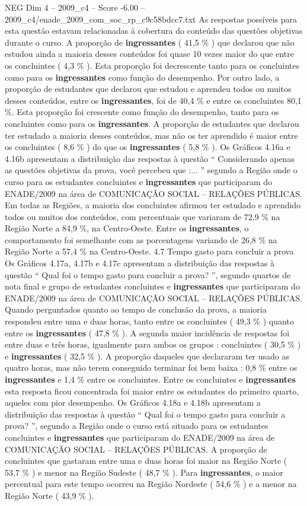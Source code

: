 \begin{textsample}{NEG Dim 4 – 2009\_c4 – Score -6.00 – 2009\_c4/enade\_2009\_com\_soc\_rp\_c9c58bdcc7.txt}
As respostas possíveis para esta questão estavam relacionadas à cobertura do conteúdo das questões objetivas durante o curso.
A proporção de \textbf{ingressantes} ( 41,5 \% ) que declarou que não estudou ainda a maioria desses conteúdos foi quase 10 vezes maior do que entre os concluintes ( 4,3 \% ).
Esta proporção foi decrescente tanto para os concluintes como para os \textbf{ingressantes} como função do desempenho.
Por outro lado, a proporção de estudantes que declarou que estudou e aprendeu todos ou muitos desses conteúdos, entre os \textbf{ingressantes}, foi de 40,4 \% e entre os concluintes 80,1 \%.
Esta proporção foi crescente como função do desempenho, tanto para os concluintes como para os \textbf{ingressantes}.
A proporção de estudantes que declarou ter estudado a maioria desses conteúdos, mas não os ter aprendido é maior entre os concluintes ( 8,6 \% ) do que os \textbf{ingressantes} ( 5,8 \% ).
Os Gráficos 4.16a e 4.16b apresentam a distribuição das respostas à questão “ Considerando apenas as questões objetivas da prova, você percebeu que :... ” segundo a Região onde o curso para os estudantes concluintes e \textbf{ingressantes} que participaram do ENADE/2009 na área de COMUNICAÇÃO SOCIAL – RELAÇÕES PÚBLICAS.
Em todas as Regiões, a maioria dos concluintes afirmou ter estudado e aprendido todos ou muitos dos conteúdos, com percentuais que variaram de 72,9 \% na Região Norte a 84,9 \%, na Centro-Oeste.
Entre os \textbf{ingressantes}, o comportamento foi semelhante com as porcentagens variando de 26,8 \% na Região Norte a 57,4 \% na Centro-Oeste. 4.7 Tempo gasto para concluir a prova Os Gráficos 4.17a, 4.17b e 4.17c apresentam a distribuição das respostas à questão “ Qual foi o tempo gasto para concluir a prova? ”, segundo quartos de nota final e grupo de estudantes concluintes e \textbf{ingressantes} que participaram do ENADE/2009 na área de COMUNICAÇÃO SOCIAL – RELAÇÕES PÚBLICAS.
Quando perguntados quanto ao tempo de conclusão da prova, a maioria respondeu entre uma e duas horas, tanto entre os concluintes ( 49,3 \% ) quanto entre os \textbf{ingressantes} ( 47,8 \% ).
A segunda maior incidência de respostas foi entre duas e três horas, igualmente para ambos os grupos : concluintes ( 30,5 \% ) e \textbf{ingressantes} ( 32,5 \% ).
A proporção daqueles que declararam ter usado as quatro horas, mas não terem conseguido terminar foi bem baixa : 0,8 \% entre os \textbf{ingressantes} e 1,4 \% entre os concluintes.
Entre os concluintes e \textbf{ingressantes} esta resposta ficou concentrada foi maior entre os estudantes do primeiro quarto, aqueles com pior desempenho.
Os Gráficos 4.18a e 4.18b apresentam a distribuição das respostas à questão “ Qual foi o tempo gasto para concluir a prova? ”, segundo a Região onde o curso está situado para os estudantes concluintes e \textbf{ingressantes} que participaram do ENADE/2009 na área de COMUNICAÇÃO SOCIAL – RELAÇÕES PÚBLICAS.
A proporção de concluintes que gastaram entre uma e duas horas foi maior na Região Norte ( 53,7 \% ) e menor na Região Sudeste ( 48,7 \% ).
Para \textbf{ingressantes}, o maior percentual para este tempo ocorreu na Região Nordeste ( 54,6 \% ) e a menor na Região Norte ( 43,9 \% ).


\end{textsample}
